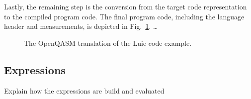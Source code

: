 Lastly, the remaining step is the conversion from the target code representation to the compiled program code. The final program code, including the language header and measurements, is depicted in Fig.~\ref{fig:codeGen_target_example}. \dots

\begin{figure}
    \centering
    
    \caption{The OpenQASM translation of the Luie code example.}
    \label{fig:codeGen_target_example}
\end{figure}


\subsection{Expressions}
\label{sec:implementation_expression}
Explain how the expressions are build and evaluated